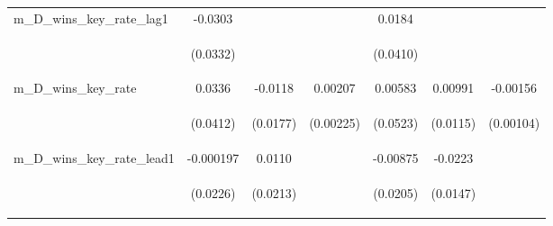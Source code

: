 \documentclass[]{article}
\begin{document}
\begin{center}
\begin{tabular}{lcccccc}
m\_D\_wins\_key\_rate\_lag1 & -0.0303 &  &  & 0.0184 &  &  \\
\vspace{4pt} & \begin{footnotesize}(0.0332)\end{footnotesize} & \begin{footnotesize}\end{footnotesize} & \begin{footnotesize}\end{footnotesize} & \begin{footnotesize}(0.0410)\end{footnotesize} & \begin{footnotesize}\end{footnotesize} & \begin{footnotesize}\end{footnotesize} \\
m\_D\_wins\_key\_rate & 0.0336 & -0.0118 & 0.00207 & 0.00583 & 0.00991 & -0.00156 \\
\vspace{4pt} & \begin{footnotesize}(0.0412)\end{footnotesize} & \begin{footnotesize}(0.0177)\end{footnotesize} & \begin{footnotesize}(0.00225)\end{footnotesize} & \begin{footnotesize}(0.0523)\end{footnotesize} & \begin{footnotesize}(0.0115)\end{footnotesize} & \begin{footnotesize}(0.00104)\end{footnotesize} \\
m\_D\_wins\_key\_rate\_lead1 & -0.000197 & 0.0110 &  & -0.00875 & -0.0223 &  \\
\vspace{4pt} & \begin{footnotesize}(0.0226)\end{footnotesize} & \begin{footnotesize}(0.0213)\end{footnotesize} & \begin{footnotesize}\end{footnotesize} & \begin{footnotesize}(0.0205)\end{footnotesize} & \begin{footnotesize}(0.0147)\end{footnotesize} & \begin{footnotesize}\end{footnotesize} \\

\end{tabular}
\end{center}
\end{document}
